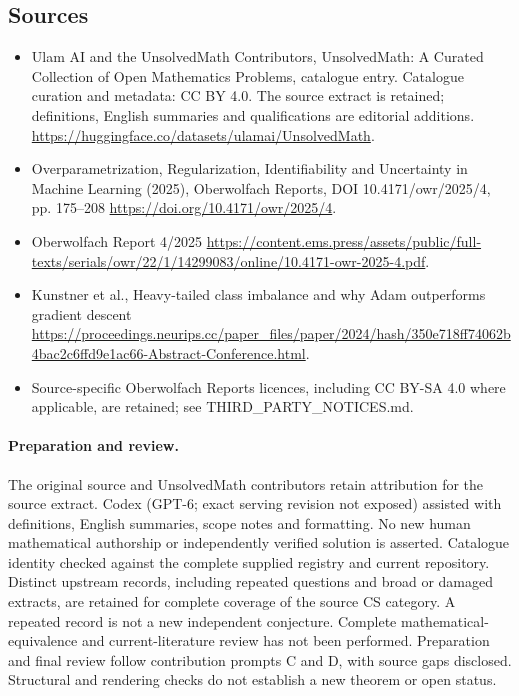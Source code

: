 \documentclass[11pt]{article}
\begin{document}
\subsection{Sources}
\begin{itemize}
\item[\hypertarget{source:statement:1}{S1}] Ulam AI and the UnsolvedMath Contributors, UnsolvedMath: A Curated Collection of Open Mathematics Problems, catalogue entry. Catalogue curation and metadata: CC BY 4.0. The source extract is retained; definitions, English summaries and qualifications are editorial additions.
\url{https://huggingface.co/datasets/ulamai/UnsolvedMath}.
\item[\hypertarget{source:statement:2}{S2}] Overparametrization, Regularization, Identifiability and Uncertainty in Machine Learning (2025), Oberwolfach Reports, DOI 10.4171/owr/2025/4, pp. 175--208
\url{https://doi.org/10.4171/owr/2025/4}.
\item[\hypertarget{source:statement:3}{S3}] Oberwolfach Report 4/2025
\url{https://content.ems.press/assets/public/full-texts/serials/owr/22/1/14299083/online/10.4171-owr-2025-4.pdf}.
\item[\hypertarget{source:statement:4}{S4}] Kunstner et al., Heavy-tailed class imbalance and why Adam outperforms gradient descent
\url{https://proceedings.neurips.cc/paper_files/paper/2024/hash/350e718ff74062b4bac2c6ffd9e1ac66-Abstract-Conference.html}.
\item Source-specific Oberwolfach Reports licences, including CC BY-SA 4.0 where applicable, are retained; see THIRD\_PARTY\_NOTICES.md.
\end{itemize}
\paragraph{Preparation and review.}
The original source and UnsolvedMath contributors retain attribution for the source extract. Codex (GPT-6; exact serving revision not exposed) assisted with definitions, English summaries, scope notes and formatting. No new human mathematical authorship or independently verified solution is asserted. Catalogue identity checked against the complete supplied registry and current repository. Distinct upstream records, including repeated questions and broad or damaged extracts, are retained for complete coverage of the source CS category. A repeated record is not a new independent conjecture. Complete mathematical-equivalence and current-literature review has not been performed. Preparation and final review follow contribution prompts C and D, with source gaps disclosed. Structural and rendering checks do not establish a new theorem or open status.
\label{end:statement}
\end{document}
